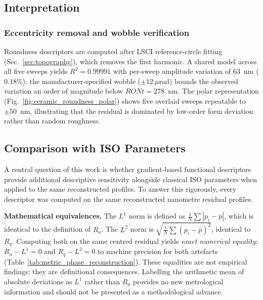 \documentclass[review]{elsarticle}
\providecommand{\DIFaddbegin}{} %
\providecommand{\DIFaddend}{} %
\newcommand{\DIFaddincludegraphics}[2][]{{\color{blue}\fbox{\DIFOincludegraphics[#1]{#2}}}} %
\DeclareRobustCommand{\DIFaddbegin}{\DIFOaddbegin \let\includegraphics\DIFaddincludegraphics} %
\DeclareRobustCommand{\DIFaddend}{\DIFOaddend \let\includegraphics\DIFOincludegraphics} %
\begin{document}
\subsection{Interpretation}

\subsubsection{Eccentricity removal and wobble verification}
\DIFaddbegin \label{sec:eccentricity}
\DIFaddend Roundness descriptors are computed after LSCI reference-circle fitting (Sec.~\ref{sec:topography}), which removes the first harmonic. A shared model across all five sweeps yields $R^2=0.99991$ with per-sweep amplitude variation of 63~nm ($0.18\%$); the manufacturer-specified wobble ($\pm 12~\mu$rad) bounds the observed variation an order of magnitude below $RONt=278$~nm. The polar representation (Fig.~\ref{fig:ceramic_roundness_polar}) shows five overlaid sweeps repeatable to $\pm 50$~nm, illustrating that the residual is dominated by low-order form deviation rather than random roughness.

\subsection{Comparison with ISO Parameters}
\label{sec:critical}

A central question of this work is whether gradient-based functional descriptors provide additional descriptive sensitivity alongside classical ISO parameters when applied to the same reconstructed profiles. To answer this rigorously, every descriptor was computed on the same reconstructed nanometre residual profiles.

\textbf{Mathematical equivalences.} The $L^1$ norm is defined as $\frac{1}{N}\sum|p_i-\bar{p}|$, which is identical to the definition of $R_a$. The $L^2$ norm is $\sqrt{\frac{1}{N}\sum(p_i-\bar{p})^2}$, identical to $R_q$. Computing both on the same centred residual yields \emph{exact numerical equality}: $R_a-L^1=0$ and $R_q-L^2=0$ to machine precision for both artefacts (Table~\ref{tab:metric_phase_reconstruction}). These equalities are not empirical findings; they are definitional consequences. Labelling the arithmetic mean of absolute deviations as $L^1$ rather than $R_a$ provides no new metrological information and should not be presented as a methodological advance.
\end{document}
